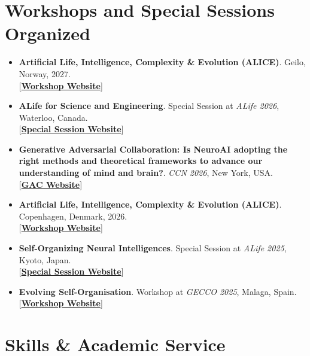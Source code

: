 \documentclass[10pt,a4paper]{article}
\newcommand{\linkbadge}[2]{%
  \textcolor{tagcolor}{[}\href{#2}{\textbf{#1}}\textcolor{tagcolor}{]}%
}
\begin{document}
\section*{Workshops and Special Sessions Organized}
\begin{itemize}[leftmargin=1.6em, itemsep=0.35em]
    \item \textbf{Artificial Life, Intelligence, Complexity \& Evolution (ALICE)}. Geilo, Norway, 2027. \\
    \linkbadge{Workshop Website}{https://aliceworkshop.org}

    \item \textbf{ALife for Science and Engineering}. Special Session at \textit{ALife 2026}, Waterloo, Canada. \\
    \linkbadge{Special Session Website}{https://alifeforscience.github.io}

    \item \textbf{Generative Adversarial Collaboration: Is NeuroAI adopting the right methods and theoretical frameworks to advance our understanding of mind and brain?}. \textit{CCN 2026}, New York, USA. \\
    \linkbadge{GAC Website}{https://sites.google.com/ccneuro.org/gac2020/gacs-by-year/2026-gacs/2026-1?authuser=0}

    \item \textbf{Artificial Life, Intelligence, Complexity \& Evolution (ALICE)}. Copenhagen, Denmark, 2026. \\
    \linkbadge{Workshop Website}{https://2026.aliceworkshop.org}

    \item \textbf{Self-Organizing Neural Intelligences}. Special Session at \textit{ALife 2025}, Kyoto, Japan. \\
    \linkbadge{Special Session Website}{https://sites.google.com/view/soni-alife}

    \item \textbf{Evolving Self-Organisation}. Workshop at \textit{GECCO 2025}, Malaga, Spain. \\
    \linkbadge{Workshop Website}{https://gecco-2025.sigevo.org/Workshopb2fc.html?itemId=5097}
\end{itemize}

\section*{Skills \& Academic Service}
\end{document}
